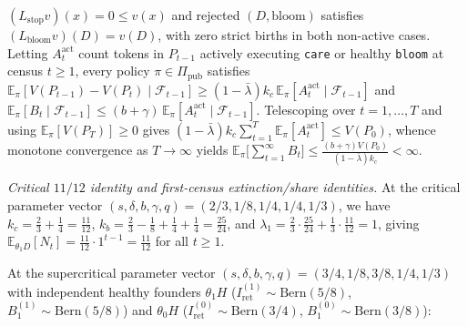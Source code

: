 \documentclass[11pt,a4paper]{article}
\begin{document}
\begin{itemize}
  \((L_{\mathrm{stop}} v)(x) = 0 \le v(x)\) and rejected
  \((D, \mathrm{bloom})\) satisfies
  \((L_{\mathrm{bloom}} v)(D) = v(D)\), with zero strict births in both
  non-active cases. Letting \(A_t^{\mathrm{act}}\) count tokens in
  \(P_{t-1}\) actively executing \texttt{care} or healthy \texttt{bloom}
  at census \(t \ge 1\), every policy \(\pi \in \Pi_{\mathrm{pub}}\)
  satisfies
  \(\mathbb{E}_\pi[V(P_{t-1}) - V(P_t) \mid \mathcal{F}_{t-1}] \ge (1 - \bar{\lambda}) k_c\, \mathbb{E}_\pi[A_t^{\mathrm{act}} \mid \mathcal{F}_{t-1}]\)
  and
  \(\mathbb{E}_\pi[B_t \mid \mathcal{F}_{t-1}] \le (b + \gamma)\, \mathbb{E}_\pi[A_t^{\mathrm{act}} \mid \mathcal{F}_{t-1}]\).
  Telescoping over \(t = 1, \dots, T\) and using
  \(\mathbb{E}_\pi[V(P_T)] \ge 0\) gives
  \((1 - \bar{\lambda}) k_c \sum_{t=1}^T \mathbb{E}_\pi[A_t^{\mathrm{act}}] \le V(P_0)\),
  whence monotone convergence as \(T \to \infty\) yields
  \(\mathbb{E}_\pi\bigl[\sum_{t=1}^\infty B_t\bigr] \le \frac{(b + \gamma) V(P_0)}{(1 - \bar{\lambda}) k_c} < \infty\).
\end{itemize}

\emph{Critical \(11/12\) identity and first-census extinction/share
identities.} At the critical parameter vector
\((s,\delta,b,\gamma,q) = (2/3, 1/8, 1/4, 1/4, 1/3)\), we have
\(k_c = \frac{2}{3} + \frac{1}{4} = \frac{11}{12}\),
\(k_b = \frac{2}{3} - \frac{1}{8} + \frac{1}{4} + \frac{1}{4} = \frac{25}{24}\),
and
\(\lambda_1 = \frac{2}{3}\cdot\frac{25}{24} + \frac{1}{3}\cdot\frac{11}{12} = 1\),
giving
\(\mathbb{E}_{\theta_1 D}[N_t] = \frac{11}{12} \cdot 1^{t-1} = \frac{11}{12}\)
for all \(t \ge 1\).

At the supercritical parameter vector
\((s,\delta,b,\gamma,q) = (3/4, 1/8, 3/8, 1/4, 1/3)\) with independent
healthy founders \(\theta_1 H\)
(\(I_{\mathrm{ret}}^{(1)} \sim \mathrm{Bern}(5/8)\),
\(B_1^{(1)} \sim \mathrm{Bern}(5/8)\)) and \(\theta_0 H\)
(\(I_{\mathrm{ret}}^{(0)} \sim \mathrm{Bern}(3/4)\),
\(B_1^{(0)} \sim \mathrm{Bern}(3/8)\)):
\end{document}
